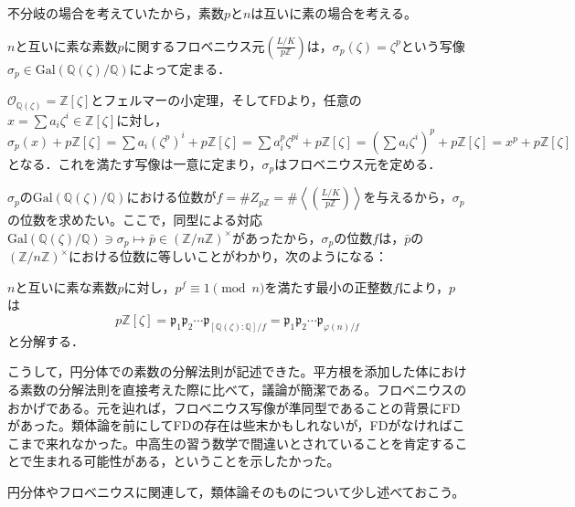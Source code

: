 不分岐の場合を考えていたから，素数$p$と$n$は互いに素の場合を考える。
\begin{prop}
    $n$と互いに素な素数$p$に関するフロベニウス元$\left(\frac{L/K}{p\mathds{Z}}\right)$は，$\sigma_p(\zeta)=\zeta^p$という写像$\sigma_p\in\mathrm{Gal}(\mathds{Q}(\zeta)/\mathds{Q})$によって定まる．
\end{prop}
\begin{prf}
    $\mathcal{O}_{\mathds{Q}(\zeta)}=\mathds{Z}[\zeta]$とフェルマーの小定理，そして$\mathsf{FD}$より，任意の$x=\sum a_i\zeta^i\in\mathds{Z}[\zeta]$に対し，$\sigma_p(x)+p\mathds{Z}[\zeta]=\sum a_i(\zeta^p)^i+p\mathds{Z}[\zeta]=\sum a_i^p\zeta^{pi}+p\mathds{Z}[\zeta]=(\sum a_i\zeta^i)^p+p\mathds{Z}[\zeta]=x^p+p\mathds{Z}[\zeta]$となる．これを満たす写像は一意に定まり，$\sigma_p$はフロベニウス元を定める．
\end{prf}
$\sigma_p$の$\mathrm{Gal}(\mathds{Q}(\zeta)/\mathds{Q})$における位数が$f=\# Z_{p\mathds{Z}}=\#\left\langle\left(\frac{L/K}{p\mathds{Z}}\right)\right\rangle$を与えるから，$\sigma_p$の位数を求めたい。ここで，同型による対応$\mathrm{Gal}(\mathds{Q}(\zeta)/\mathds{Q})\ni\sigma_p\mapsto\bar{p}\in (\mathds{Z}/n\mathds{Z})^{\times}$があったから，$\sigma_p$の位数$f$は，$\bar{p}$の$(\mathds{Z}/n\mathds{Z})^{\times}$における位数に等しいことがわかり，次のようになる：
\begin{thm}
    $n$と互いに素な素数$p$に対し，$p^f\equiv 1\pmod{n}$を満たす最小の正整数$f$により，$p$は\[
    p\mathds{Z}[\zeta]=\mathfrak{p}_1\mathfrak{p}_2\cdots\mathfrak{p}_{[\mathds{Q}(\zeta):\mathds{Q}]/f}=\mathfrak{p}_1\mathfrak{p}_2\cdots\mathfrak{p}_{\varphi(n)/f}
    \]と分解する．
\end{thm}
こうして，円分体での素数の分解法則が記述できた。平方根を添加した体における素数の分解法則を直接考えた際に比べて，議論が簡潔である。フロベニウスのおかげである。元を辿れば，フロベニウス写像が準同型であることの背景に\textsf{FD}があった。類体論を前にして\textsf{FD}の存在は些末かもしれないが，\textsf{FD}がなければここまで来れなかった。中高生の習う数学で間違いとされていることを肯定することで生まれる可能性がある，ということを示したかった。

円分体やフロベニウスに関連して，類体論そのものについて少し述べておこう。

